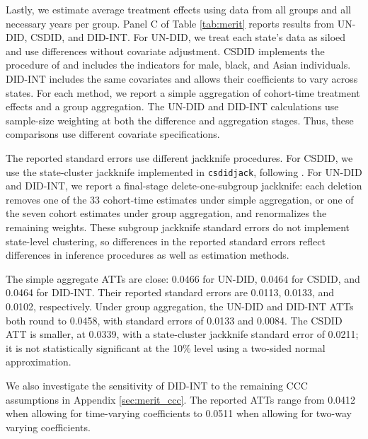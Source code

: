 Lastly, we estimate average treatment effects using data from all groups and all necessary years per group. Panel C of Table \ref{tab:merit} reports results from UN-DID, CSDID, and DID-INT. For UN-DID, we treat each state's data as siloed and use differences without covariate adjustment. CSDID implements the procedure of \citet{callaway2021difference} and includes the indicators for male, black, and Asian individuals. DID-INT includes the same covariates and allows their coefficients to vary across states. For each method, we report a simple aggregation of cohort-time treatment effects and a group aggregation. The UN-DID and DID-INT calculations use sample-size weighting at both the difference and aggregation stages. Thus, these comparisons use different covariate specifications.

The reported standard errors use different jackknife procedures. For CSDID, we use the state-cluster jackknife implemented in \texttt{csdidjack}, following \citet{karim2026improvedinferencecsdidusing}. For UN-DID and DID-INT, we report a final-stage delete-one-subgroup jackknife: each deletion removes one of the 33 cohort-time estimates under simple aggregation, or one of the seven cohort estimates under group aggregation, and renormalizes the remaining weights. These subgroup jackknife standard errors do not implement state-level clustering, so differences in the reported standard errors reflect differences in inference procedures as well as estimation methods.

The simple aggregate ATTs are close: 0.0466 for UN-DID, 0.0464 for CSDID, and 0.0464 for DID-INT. Their reported standard errors are 0.0113, 0.0133, and 0.0102, respectively. Under group aggregation, the UN-DID and DID-INT ATTs both round to 0.0458, with standard errors of 0.0133 and 0.0084. The CSDID ATT is smaller, at 0.0339, with a state-cluster jackknife standard error of 0.0211; it is not statistically significant at the 10\% level using a two-sided normal approximation.

We also investigate the sensitivity of DID-INT to the remaining CCC assumptions in Appendix \ref{sec:merit_ccc}. The reported ATTs range from 0.0412 when allowing for time-varying coefficients to 0.0511 when allowing for two-way varying coefficients.
